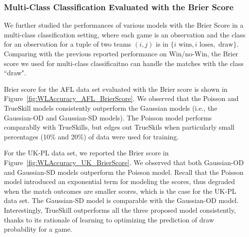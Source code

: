 \subsubsection{Multi-Class Classification Evaluated with the Brier Score}
We further studied the performances of various models with the Brier Score in a multi-class classification setting, where each game is an observation and the class for an observation for a tuple of two teams $(i, j)$ is in $\{i\text{ wins}, i\text{ loses}, \text{ draw}\}$. Comparing with the previous reported performance on Win/no-Win, the Brier score we used for multi-class classificaitno can handle the matches with the class ``draw". 

Brier score for the AFL data set evaluated with the Brier score is shown in Figure~\ref{fig:WLAccuracy_AFL_BrierScore}. We observed that the Poisson and TrueSkill models consistently outperform the Gaussian models (i.e., the Gaussian-OD and Gaussian-SD models). The Poisson model performs comparablly with TrueSkills, but edges out TrueSkils when particularly small percentages (10\% and 20\%) of data were used for training. 

\begin{center}
\begin{figure*}[t!]
 \centering
\caption{\small Results on the AFL data set, evaluated using the Brier Score for multi-class classification. Error bars indicate
standard errors.}
\label{fig:WLAccuracy_AFL_BrierScore}
\end{figure*}
\end{center}

For the UK-PL data set, we reported the Brier score in Figure~\ref{fig:WLAccuracy_UK_BrierScore}. We observed that both Gaussian-OD and Gaussian-SD models outperform the Poisson model. Recall that the Poisson model introduced an exponential term for modeling the scores, thus degraded when the match outcomes are smaller scores, which is the case for the UK-PL data set. The Gaussian-SD model is comparable with the Gaussian-OD model. Interestingly, TrueSkill outperforms all the three proposed model consistently, thanks to its rationale of learning to optimizing the prediction of draw probability for a game. 
\begin{center}
\begin{figure*}[t!]
 \centering
\caption{\small Results on the UK data set, evaluated using the Brier Score for multi-class classification. Error bars indicate
standard errors.}
\label{fig:WLAccuracy_UK_BrierScore}
\end{figure*}
\end{center}

